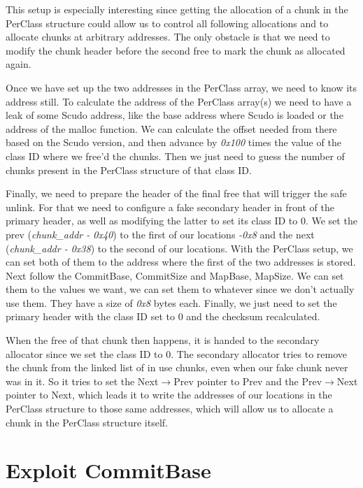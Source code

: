 \documentclass[a4paper,11pt,oneside]{report}
\begin{document}
This setup
is especially interesting since getting the allocation of a chunk in the PerClass
structure could allow us to control all following allocations and to allocate chunks at
arbitrary addresses. The only obstacle is that we need to modify the chunk header before
the second free to mark the chunk as allocated again.

Once we have set up the two addresses in the PerClass array, we need to know its address
still. To calculate the address of the PerClass array(s) we need to have a leak of some
Scudo address, like the base address where Scudo is loaded or the address of the malloc
function. We can calculate the offset needed from there based on the Scudo version, and
then advance by \emph{0x100} times the value of the class ID where we free'd the
chunks. Then we just need to guess the number of chunks present in the PerClass structure
of that class ID.

Finally, we need to prepare the header of the final free that will trigger the safe
unlink. For that we need to configure a fake secondary header in front of the primary
header, as well as modifying the latter to set its class ID to 0. We set the prev
(\emph{chunk\_addr - 0x40}) to the first of our locations \emph{-0x8} and the next
(\emph{chunk\_addr - 0x38}) to the second of our locations. With the PerClass setup, we
can set both of them to the address where the first of the two addresses is stored.  Next
follow the CommitBase, CommitSize and MapBase, MapSize. We can set them to the values we
want, we can set them to whatever since we don't actually use them. They have a size of
\emph{0x8} bytes each.  Finally, we just need to set the primary header with the class ID
set to 0 and the checksum recalculated.

When the free of that chunk then happens, it is handed to the secondary allocator since we
set the class ID to 0. The secondary allocator tries to remove the chunk from the linked
list of in use chunks, even when our fake chunk never was in it. So it tries to set the
Next$\rightarrow$Prev pointer to Prev and the Prev$\rightarrow$Next pointer to Next, which leads it to write the
addresses of our locations in the PerClass structure to those same addresses, which will
allow us to allocate a chunk in the PerClass structure itself.

\section{Exploit CommitBase}
\end{document}

